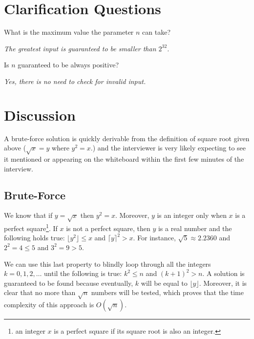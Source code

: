 \section{Clarification Questions}
\begin{QandA}
	\item \begin{questionitem} \begin{question} What is the maximum value the parameter $n$ can take?  \end{question} 	 
    \begin{answered}
		\textit{The greatest input is guaranteed to be smaller than $2^{32}$.}
	\end{answered} \end{questionitem}
	
	\item \begin{questionitem} \begin{question} Is $n$ guaranteed to be always positive?  \end{question} 	 
    \begin{answered}
		\textit{Yes, there is no need to check for invalid input.}
	\end{answered} \end{questionitem}
\end{QandA}

\section{Discussion}
A brute-force solution is quickly derivable from the definition of square root given above ($\sqrt{x} = y$ where $y^2 = x$.) and the interviewer
is very likely expecting to see it mentioned or appearing on the whiteboard
within the first few minutes of the interview. 

\subsection{Brute-Force}
We know that if $y = \sqrt{x}$ then $y^2 = x$. Moreover, $y$ is an integer only when $x$ is a perfect square\footnote{an integer $x$ is a perfect square if its square root is also an integer.}. 
If $x$ is not a perfect square, then $y$ is a real number and the following holds true: 
$\lfloor{y}^2 \rfloor \leq x$ and $\lceil{y} \rceil^2 > x$.
For instance, $\sqrt{5} \approx 2.2360$ and $2^2=4 \leq 5$ and $3^2=9 > 5$.

We can use this last property to blindly loop through all the integers $k=0,1,2,\ldots$ until 
the following is true: $k^2\leq n$ and $(k+1)^2 > n$.
A solution is guaranteed to be found because eventually, $k$ will be equal to $\lfloor y \rfloor$.
Moreover, it is clear that no more than $\sqrt{n}$ numbers will be tested, which proves that the time complexity of this approach is $O(\sqrt{n})$.

